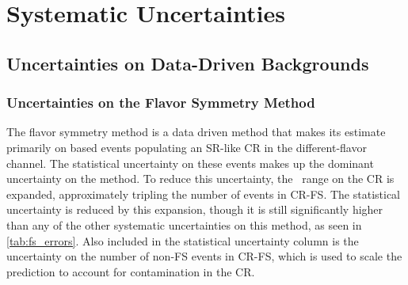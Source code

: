 
\chapter{Systematic Uncertainties} %

\label{ch:backgrounds} 

\section{Uncertainties on Data-Driven Backgrounds}

\subsection{Uncertainties on the Flavor Symmetry Method}
\label{sec:unc_fs}

The flavor symmetry method is a data driven method that makes its estimate primarily on based events populating an \ac{SR}-like \ac{CR} in the different-flavor channel. The statistical uncertainty on these events makes up the dominant uncertainty on the method. To reduce this uncertainty, the \mll~range on the \ac{CR} is expanded, approximately tripling the number of events in CR-FS. The statistical uncertainty is reduced by this expansion, though it is still significantly higher than any of the other systematic uncertainties on this method, as seen in \autoref{tab:fs_errors}. Also included in the statistical uncertainty column is the uncertainty on the number of non-\ac{FS} events in CR-FS, which is used to scale the prediction to account for contamination in the \ac{CR}. 

